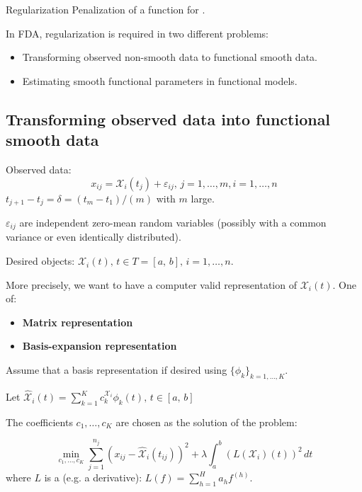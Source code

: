 \begin{definition}{Regularization}{}
    Penalization of a function for .
\end{definition}

In FDA, regularization is required in two different problems:
\begin{itemize}
    \item Transforming observed non-smooth data to functional smooth data.
    \item Estimating smooth functional parameters in functional models.
\end{itemize}

\subsection{Transforming observed data into functional smooth data}

Observed data:
\begin{equation*}
    x_{ij} = \mathcal X_i(t_j) + \varepsilon_{ij},\, j = 1,\ldots, m, i = 1,\ldots, n
\end{equation*}
$t_{j+1} - t_j = \delta = (t_m - t_1)/(m)$ with $m$ large.

$\varepsilon_{ij}$ are independent zero-mean random variables
(possibly with a common variance or even identically distributed).

Desired objects: $\mathcal X_i(t),\,t\in T = [a,\,b],\, i = 1,\ldots, n$.

More precisely, we want to have a computer valid representation of
$\mathcal X_i(t)$. One of:
\begin{itemize}
    \item \textbf{Matrix representation}
    \item \textbf{Basis-expansion representation}
\end{itemize}

Assume that a basis representation if desired using $\{\phi_k\}_{k=1,\ldots,K}$.

Let $\hat{\mathcal X}_i(t) = \sum_{k=1}^K c_{k}^{\mathcal X_i} \phi_k(t),\,t \in [a,\,b]$

The coefficients $c_1,\ldots,c_K$ are chosen as the solution of the problem:

\begin{problem}{}{}
    \begin{equation*}
        \min_{c_1,\ldots,c_K} 
        \sum_{j=1}^{n_j} \left(
            x_{ij} - \hat{\mathcal X}_i(t_{ij})
        \right)^2
        + \lambda
        \int_{a}^{b} \left(
            L(\mathcal X_i)(t)
        \right)^2\, dt
    \end{equation*}
    where $L$ is a  (e.g. a derivative):
    $L(f) = \sum_{h=1}^H a_h f^{(h)}$.
\end{problem}

